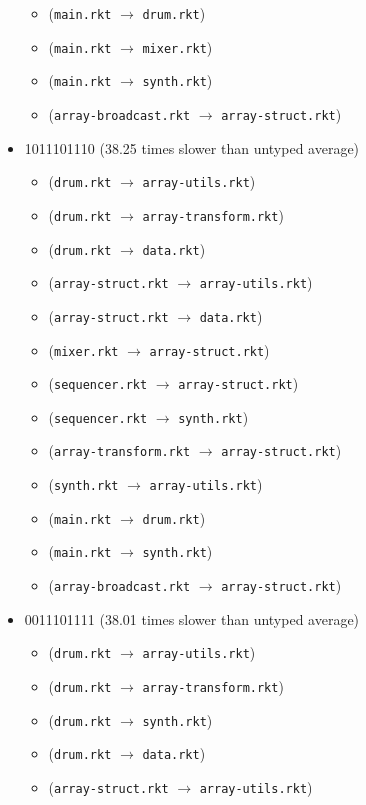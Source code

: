 \documentclass{article}
\newcommand{\mono}[1]{\texttt{#1}}
\begin{document}
\begin{itemize}
\begin{itemize}
  \item (\mono{main.rkt} $\rightarrow$ \mono{drum.rkt})
  \item (\mono{main.rkt} $\rightarrow$ \mono{mixer.rkt})
  \item (\mono{main.rkt} $\rightarrow$ \mono{synth.rkt})
  \item (\mono{array-broadcast.rkt} $\rightarrow$ \mono{array-struct.rkt})
  \end{itemize}
\item 1011101110 (38.25 times slower than untyped average)
  \begin{itemize}
  \item (\mono{drum.rkt} $\rightarrow$ \mono{array-utils.rkt})
  \item (\mono{drum.rkt} $\rightarrow$ \mono{array-transform.rkt})
  \item (\mono{drum.rkt} $\rightarrow$ \mono{data.rkt})
  \item (\mono{array-struct.rkt} $\rightarrow$ \mono{array-utils.rkt})
  \item (\mono{array-struct.rkt} $\rightarrow$ \mono{data.rkt})
  \item (\mono{mixer.rkt} $\rightarrow$ \mono{array-struct.rkt})
  \item (\mono{sequencer.rkt} $\rightarrow$ \mono{array-struct.rkt})
  \item (\mono{sequencer.rkt} $\rightarrow$ \mono{synth.rkt})
  \item (\mono{array-transform.rkt} $\rightarrow$ \mono{array-struct.rkt})
  \item (\mono{synth.rkt} $\rightarrow$ \mono{array-utils.rkt})
  \item (\mono{main.rkt} $\rightarrow$ \mono{drum.rkt})
  \item (\mono{main.rkt} $\rightarrow$ \mono{synth.rkt})
  \item (\mono{array-broadcast.rkt} $\rightarrow$ \mono{array-struct.rkt})
  \end{itemize}
\item 0011101111 (38.01 times slower than untyped average)
  \begin{itemize}
  \item (\mono{drum.rkt} $\rightarrow$ \mono{array-utils.rkt})
  \item (\mono{drum.rkt} $\rightarrow$ \mono{array-transform.rkt})
  \item (\mono{drum.rkt} $\rightarrow$ \mono{synth.rkt})
  \item (\mono{drum.rkt} $\rightarrow$ \mono{data.rkt})
  \item (\mono{array-struct.rkt} $\rightarrow$ \mono{array-utils.rkt})

\end{itemize}
\end{itemize}
\end{document}
